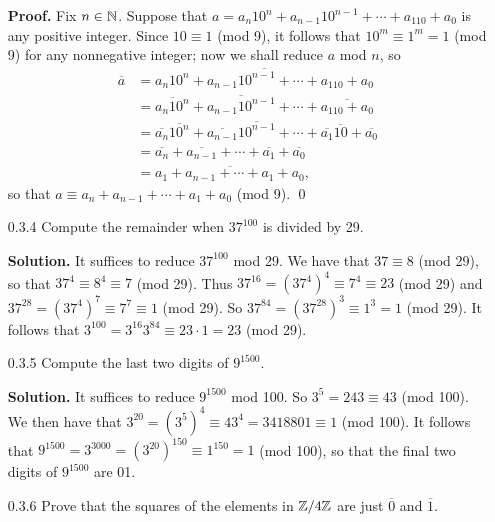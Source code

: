 \begin{enumerate}
      \textbf{Proof.} Fix $n \in \mathbb{N}$. Suppose that $a = a_n10^n +
      a_{n - 1}10^{n - 1} + \cdots + a_110 + a_0$ is any positive integer. Since
      $10 \equiv 1$ (mod 9), it follows that $10^m \equiv 1^m = 1$ (mod 9) for
      any nonnegative integer; now we shall reduce $a$ mod $n$, so
      \begin{align*}
         \overline{a} &= \overline{a_n10^n + a_{n - 1}10^{n - 1} + \cdots +
                         a_110 + a_0} \\
                      &= \overline{a_n10^n} + \overline{a_{n - 1}10^{n - 1}} +
                         \cdots + \overline{a_110 + a_0} \\
                      &= \overline{a_n}\overline{10^n} +
                         \overline{a_{n - 1}}\overline{10^{n - 1}} + \cdots +
                         \overline{a_1}\overline{10} + \overline{a_0} \\
                      &= \overline{a_n} + \overline{a_{n - 1}} + \cdots +
                         \overline{a_1} + \overline{a_0} \\
                      &= \overline{a_1 + a_{n - 1} + \cdots + a_1 + a_0},
      \end{align*}
      so that $a \equiv a_n + a_{n - 1} + \cdots + a_1 + a_0$ (mod 9). \qed
   \item[0.3.4]   Compute the remainder when $37^{100}$ is divided by 29.
   
      \textbf{Solution.} It suffices to reduce $37^{100}$ mod 29. We have that
      $37 \equiv 8$ (mod 29), so that $37^4 \equiv 8^4 \equiv 7$ (mod 29). Thus
      $37^{16} = (37^4)^4 \equiv 7^4 \equiv 23$ (mod 29) and
      $37^{28} = (37^4)^7 \equiv 7^7 \equiv 1$ (mod 29).
      So $37^{84} = (37^{28})^3 \equiv 1^3 = 1$ (mod 29). It follows that
      $3^{100} = 3^{16}3^{84} \equiv 23 \cdot 1 = 23$ (mod 29).
   \item[0.3.5]   Compute the last two digits of $9^{1500}$.
   
      \textbf{Solution.} It suffices to reduce $9^{1500}$ mod 100. So
       $3^5 = 243 \equiv 43$ (mod 100). We then have that
       $3^{20} = (3^5)^4 \equiv 43^4 = 3418801 \equiv 1$ (mod 100). It follows
       that $9^{1500} = 3^{3000} = (3^{20})^{150} \equiv 1^{150} = 1$ (mod 100),
       so that the final two digits of $9^{1500}$ are 01.
   \item[0.3.6]   Prove that the squares of the elements in $\mathbb{Z}/4\mathbb{Z}$ are just
                  $\overline{0}$ and $\overline{1}$.
                  

\end{enumerate}
